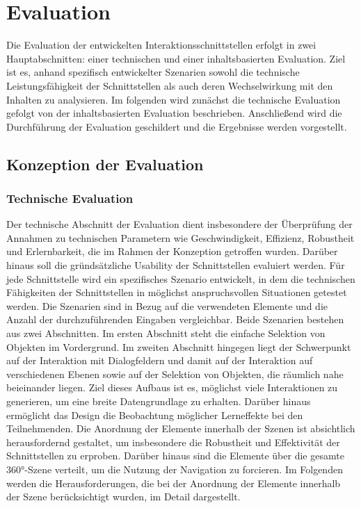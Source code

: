 \chapter{Evaluation}
\label{chap:Evaluation}

Die Evaluation der entwickelten Interaktionsschnittstellen erfolgt in zwei Hauptabschnitten: einer technischen und einer inhaltsbasierten Evaluation. Ziel ist es, anhand spezifisch entwickelter Szenarien sowohl die technische Leistungsfähigkeit der Schnittstellen als auch deren Wechselwirkung mit den Inhalten zu analysieren. Im folgenden wird zunächst die technische Evaluation gefolgt von der inhaltsbasierten Evaluation beschrieben. Anschließend wird die Durchführung der Evaluation geschildert und die Ergebnisse werden vorgestellt. 

\section{Konzeption der Evaluation}

\subsection{Technische Evaluation}

Der technische Abschnitt der Evaluation dient insbesondere der Überprüfung der Annahmen zu technischen Parametern wie Geschwindigkeit, Effizienz, Robustheit und Erlernbarkeit, die im Rahmen der Konzeption getroffen wurden. Darüber hinaus soll die gründsätzliche Usability der Schnittstellen evaluiert werden. Für jede Schnittstelle wird ein spezifisches Szenario entwickelt, in dem die technischen Fähigkeiten der Schnittstellen in möglichst anspruchsvollen Situationen getestet werden. Die Szenarien sind in Bezug auf die verwendeten Elemente und die Anzahl der durchzuführenden Eingaben vergleichbar. Beide Szenarien bestehen aus zwei Abschnitten. Im ersten Abschnitt steht die einfache Selektion von Objekten im Vordergrund. Im zweiten Abschnitt hingegen liegt der Schwerpunkt auf der Interaktion mit Dialogfeldern und damit auf der Interaktion auf verschiedenen Ebenen sowie auf der Selektion von Objekten, die räumlich nahe beieinander liegen. Ziel dieses Aufbaus ist es, möglichst viele Interaktionen zu generieren, um eine breite Datengrundlage zu erhalten. Darüber hinaus ermöglicht das Design die Beobachtung möglicher Lerneffekte bei den Teilnehmenden. Die Anordnung der Elemente innerhalb der Szenen ist absichtlich herausfordernd gestaltet, um insbesondere die Robustheit und Effektivität der Schnittstellen zu erproben. Darüber hinaus sind die Elemente über die gesamte 360°-Szene verteilt, um die Nutzung der Navigation zu forcieren. Im Folgenden werden die Herausforderungen, die bei der Anordnung der Elemente innerhalb der Szene berücksichtigt wurden, im Detail dargestellt. 

